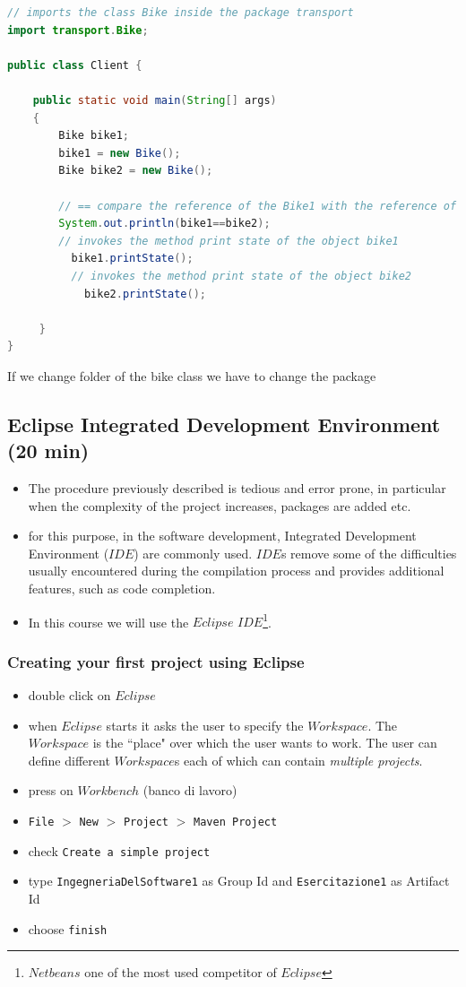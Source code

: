 \documentclass{article}
\theoremstyle{definition}
\begin{document}
\begin{lstlisting}[language=Java,escapechar=|]
// imports the class Bike inside the package transport
import transport.Bike;

public class Client {
	
	public static void main(String[] args)
    {
        Bike bike1; 
        bike1 = new Bike();
        Bike bike2 = new Bike(); 
        
        // == compare the reference of the Bike1 with the reference of the Bike2
        System.out.println(bike1==bike2);
        // invokes the method print state of the object bike1       
          bike1.printState();
          // invokes the method print state of the object bike2
            bike2.printState();

     }
}
\end{lstlisting}

If we change folder of the bike class we have to change the package

\subsection{Eclipse Integrated Development Environment  (20 min)}
\begin{itemize}
\item The procedure previously described is tedious and error prone, in particular when the complexity of the project increases, packages are added etc.
\item for this purpose, in the software development,  Integrated Development Environment ($IDE$) are commonly used. $IDE$s remove some of the difficulties usually encountered during the compilation process and provides additional features, such as code completion.
\item In this course we will use the $Eclipse$ $IDE$\footnote{$Netbeans$ one of the most used competitor of $Eclipse$}.  
\end{itemize}

\subsubsection{Creating your first project using Eclipse}
\begin{itemize}
\item double click on $Eclipse$
\item when $Eclipse$ starts it asks the user to specify the $Workspace$. The $Workspace$ is the ``place" over which the user wants to work. The user can define different $Workspace$s each of which can contain \emph{multiple projects}.
\item press on $Workbench$ (banco di lavoro)
\item \texttt{File} $>$ \texttt{New} $>$ \texttt{Project} $>$ \texttt{Maven Project}
\item check \texttt{Create a simple project}
\item type \texttt{IngegneriaDelSoftware1} as Group Id and \texttt{Esercitazione1} as Artifact Id
\item choose \texttt{finish}
\end{itemize}
\end{document}
